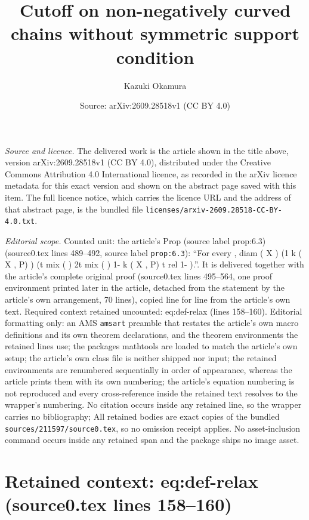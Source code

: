 \documentclass[10pt,a4paper]{amsart}
\title[Cutoff on non-negatively curved chains without symmetric support condition]{Cutoff on non-negatively curved chains without symmetric support condition}
\author{Kazuki Okamura}
\date{Source: arXiv:2609.28518v1 (CC BY 4.0)}
\theoremstyle{plain}
\theoremstyle{definition}
\begin{document}
\maketitle

\noindent\emph{Source and licence.} The delivered work is the article shown in the title above, version arXiv:2609.28518v1 (CC BY 4.0), distributed under the Creative Commons Attribution 4.0 International licence, as recorded in the arXiv licence metadata for this exact version and shown on the abstract page saved with this item. The full licence notice, which carries the licence URL and the address of that abstract page, is the bundled file \texttt{licenses/arxiv-2609.28518-CC-BY-4.0.txt}.
\par\smallskip

\noindent\textit{Editorial scope.} Counted unit: the article's Prop (source label prop:6.3) (source0.tex lines 489--492, source label \texttt{prop:6.3}): ``For every , diam ( X ) (1 k ( X , P) ) (t mix ( ) 2t mix ( ) 1- k ( X , P) t rel 1- ).''. It is delivered together with the article's complete original proof (source0.tex lines 495--564, one proof environment printed later in the article, detached from the statement by the article's own arrangement, 70 lines), copied line for line from the article's own text. Required context retained uncounted: eq:def-relax (lines 158--160). Editorial formatting only: an AMS \texttt{amsart} preamble that restates the article's own macro definitions and its own theorem declarations, and the theorem environments the retained lines use; the packages mathtools are loaded to match the article's own setup; the article's own class file is neither shipped nor input; the retained environments are renumbered sequentially in order of appearance, whereas the article prints them with its own numbering; the article's equation numbering is not reproduced and every cross-reference inside the retained text resolves to the wrapper's numbering. No citation occurs inside any retained line, so the wrapper carries no bibliography; All retained bodies are exact copies of the bundled \texttt{sources/211597/source0.tex}, so no omission receipt applies. No asset-inclusion command occurs inside any retained span and the package ships no image asset.


\section*{Retained context: eq:def-relax (source0.tex lines 158--160)}
\end{document}
